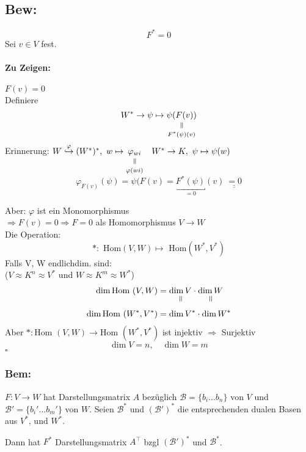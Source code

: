 \documentclass[titlepage,12pt,a4paper,ngerman]{report}
\newenvironment{bew}[1]{\subsection{Bew: #1}}{\hfill$\square$}
\newcommand{\Bew}[2]{\begin{bew}{#1}#2\end{bew}}
\newcommand{\verteq}{\rotatebox{90}{$\,=$}}
\newcommand{\equalto}[2]{\underset{\scriptstyle\overset{\mkern4mu\verteq}{#2}}{#1}}
\newcommand{\tx}[1]{\textrm{#1}}
\begin{document}
\Bew{}{
$$F^* = 0$$
Sei $v \in V$ fest. \\
\paragraph{Zu Zeigen:} 
$F (v) = 0$ \\[10pt]
Definiere $$W^* \to \psi \mapsto \equalto{\psi (F(v))}{F^* (\psi)(v)}$$ 
Erinnerung: $W \buildrel \varphi \over \hookrightarrow (W^*)^* , \ w \mapsto \equalto{\varphi_{wi}}{\varphi(wi)} \quad W^* \to K, \ \psi \mapsto \psi(w)$
$$\varphi_{F(v)} (\psi) = \psi (F(v) = \underbracket{F^* (\psi)}_{=0} (v) \ \underline{\underline{= 0}}$$


Aber: $ \varphi $ ist ein Monomorphismus\\
$ \Rightarrow F(v) = 0 \Rightarrow  F = 0 $ als Homomorphismus $ V\to W $\\
Die Operation:
$$ * : \tx{ Hom}(V,W) \mapsto \tx{ Hom}(W^*,V^*)$$
Falls V, W endlichdim. sind:\\
($ V \approx K^n \approx V^*  $ und $ W \approx K^m \approx W^* $)\\

\begin{align*}
\dim \tx{Hom }(V,W) &= \equalto{\dim V}{} \cdot \equalto{\dim W}{}\\
\dim \tx{Hom }(W^*,V^*) &= \dim V^* \cdot \dim W^*
\end{align*} 
Aber $*: \tx{Hom }(V,W) \to \tx{Hom }(W^*, V^*)$ ist injektiv $\Rightarrow$ Surjektiv
$$\dim V = n, \quad \dim W = m$$
}
\subsubsection*{Bem:}
$F: V \to W$ hat Darstellungsmatrix $A$ bezüglich $\mathcal B = \{b_i \dots b_n\}$ von $V$ und $\mathcal B' = \{b_i' \dots b_m'\}$ von $W$. Seien $\mathcal B^*$ und $(\mathcal B')^*$ die entsprechenden dualen Basen aus $V^* \tx{, und } W^*$.


Dann hat $ F^* $ Darstellungsmatrix $ A^\top $ bzgl $ (\mathcal{B}')^* $ und $ \mathcal{B}^* $.
\end{document}
